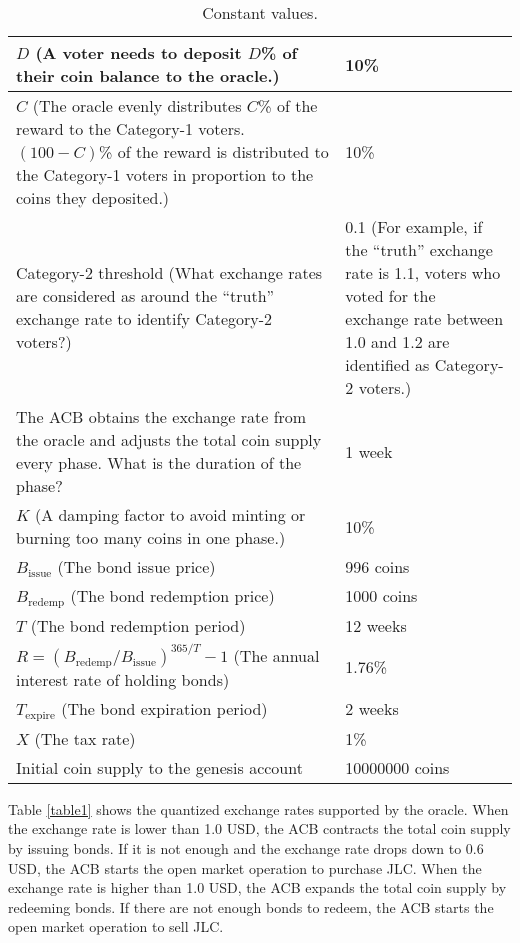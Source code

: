 \documentclass[dvipdfmx,a4paper]{article}
\begin{document}
\begin{table}[htb]
\begin{center}
\caption{Constant values.}\vspace{2ex}
\begin{tabular}{p{24em}|p{14em}}\hline
$D$ (A voter needs to deposit $D$\% of their coin balance to the oracle.) & 10\%\\\hline
$C$ (The oracle evenly distributes $C$\% of the reward to the Category-1 voters. $(100-C)$\% of the reward is distributed to the Category-1 voters in proportion to the coins they deposited.) & 10\%\\\hline
Category-2 threshold (What exchange rates are considered as around the ``truth'' exchange rate to identify Category-2 voters?) & 0.1 (For example, if the ``truth'' exchange rate is 1.1, voters who voted for the exchange rate between 1.0 and 1.2 are identified as Category-2 voters.)\\\hline
The ACB obtains the exchange rate from the oracle and adjusts the total coin supply every phase. What is the duration of the phase? & 1 week\\\hline
$K$ (A damping factor to avoid minting or burning too many coins in one phase.) & 10\%\\\hline
$B_{\mathrm{issue}}$ (The bond issue price) & 996 coins\\\hline
$B_{\mathrm{redemp}}$ (The bond redemption price) & 1000 coins\\\hline
$T$ (The bond redemption period) & 12 weeks\\\hline
$R=(B_{\mathrm{redemp}}/B_{\mathrm{issue}})^{365/T}-1$ (The annual interest rate of holding bonds) & 1.76\%\\\hline
$T_{\mathrm{expire}}$ (The bond expiration period) & 2 weeks\\\hline
$X$ (The tax rate) & 1\%\\\hline
Initial coin supply to the genesis account & 10000000 coins\\\hline
\end{tabular}
\label{table2}
\end{center}
\end{table}

Table \ref{table1} shows the quantized exchange rates supported by the oracle. When the exchange rate is lower than 1.0 USD, the ACB contracts the total coin supply by issuing bonds. If it is not enough and the exchange rate drops down to 0.6 USD, the ACB starts the open market operation to purchase JLC. When the exchange rate is higher than 1.0 USD, the ACB expands the total coin supply by redeeming bonds. If there are not enough bonds to redeem, the ACB starts the open market operation to sell JLC.
\end{document}
